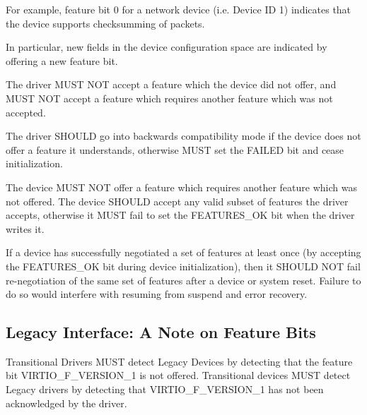 \begin{note}
For example, feature bit 0 for a network device (i.e.
Device ID 1) indicates that the device supports checksumming of
packets.
\end{note}

In particular, new fields in the device configuration space are
indicated by offering a new feature bit.

The driver MUST NOT accept a feature which the device did not offer,
and MUST NOT accept a feature which requires another feature which was
not accepted.

The driver SHOULD go into backwards compatibility mode
if the device does not offer a feature it understands, otherwise MUST
set the FAILED  bit and cease initialization.

The device MUST NOT offer a feature which requires another feature
which was not offered.  The device SHOULD accept any valid subset
of features the driver accepts, otherwise it MUST fail to set the
FEATURES_OK  bit when the driver writes it.

If a device has successfully negotiated a set of features
at least once (by accepting the FEATURES_OK  bit during device initialization), then it SHOULD
NOT fail re-negotiation of the same set of features after
a device or system reset.  Failure to do so would interfere
with resuming from suspend and error recovery.

\subsection{Legacy Interface: A Note on Feature
Bits}\label{sec:Basic Facilities of a Virtio Device / Feature
Bits / Legacy Interface: A Note on Feature Bits}

Transitional Drivers MUST detect Legacy Devices by detecting that
the feature bit VIRTIO_F_VERSION_1 is not offered.
Transitional devices MUST detect Legacy drivers by detecting that
VIRTIO_F_VERSION_1 has not been acknowledged by the driver.

